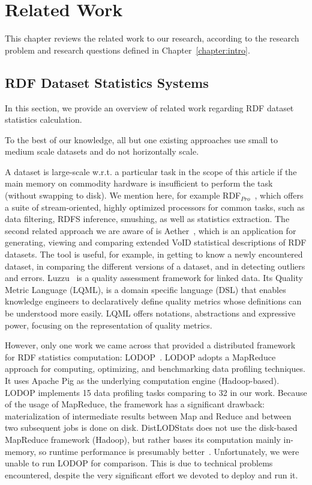 \chapter{Related Work}
\label{chapter:related}

This chapter reviews the related work to our research, according to the research problem and research questions defined in Chapter~\ref{chapter:intro}.

\section{RDF Dataset Statistics Systems}
In this section, we provide an overview of related work regarding RDF dataset statistics calculation.

To the best of our knowledge, all but one existing approaches use small to medium scale datasets and do not horizontally scale.

A dataset is large-scale w.r.t. a particular task in the scope of this article if the main memory on commodity hardware is insufficient to perform the task (without swapping to disk). 
We mention here, for example RDF$_{Pro}$~\cite{SAC-2015-CorcoglionitiRM}, which offers a suite of stream-oriented, highly optimized processors for common tasks, such as data filtering, RDFS inference, smushing, as well as statistics extraction. 
The second related approach we are aware of is Aether~\cite{makela2014aether}, which is an application for generating, viewing and comparing extended VoID statistical descriptions of RDF datasets.
The tool is useful, for example, in getting to know a newly encountered dataset, in comparing the different versions of a dataset, and in detecting outliers and errors.
Luzzu~\cite{debattista2016luzzu} is a quality assessment framework for linked data.
Its Quality Metric Language (LQML), is a domain specific language (DSL) that enables knowledge engineers to declaratively define quality metrics whose definitions can be understood more easily. LQML offers notations, abstractions and expressive power, focusing on the representation of quality metrics.

However, only one work we came across that provided a distributed framework for RDF statistics computation: LODOP~\cite{Forchhammer:PROFILES:14}. 
LODOP adopts a MapReduce approach for computing, optimizing, and benchmarking data profiling techniques.
It uses Apache Pig as the underlying computation engine (Hadoop-based). 
LODOP implements 15 data profiling tasks comparing to 32 in our work. 
Because of the usage of MapReduce, the framework has a significant drawback: materialization of intermediate results between Map and Reduce and between two subsequent jobs is done on disk.
DistLODStats does not use the disk-based MapReduce framework (Hadoop), but rather bases its computation mainly in-memory, so runtime performance is presumably better~\cite{Shi:2015:CTM:2831360.2831365}.
Unfortunately, we were unable to run LODOP for comparison. This is due to technical problems encountered, despite the very significant effort we devoted to deploy and run it.

